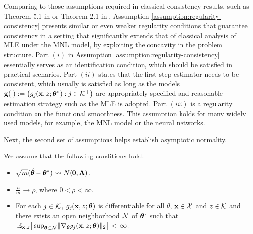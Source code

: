 Comparing to those assumptions required in classical consistency results, such as Theorem 5.1 in \cite{van2000asymptotic} or Theorem 2.1 in \cite{newey1994large}, Assumption \ref{assumption:regularity-consistency} presents similar or even weaker regularity conditions that guarantee consistency in a setting that significantly extends that of classical analysis of MLE under the MNL model, by exploiting the concavity in the problem structure. Part $(i)$ in Assumption \ref{assumption:regularity-consistency} essentially serves as an identification condition, which should be satisfied in practical scenarios. Part $(ii)$ states that the first-step estimator needs to be consistent, which usually is satisfied as long as the models $\mathbf{g}(\cdot) := \big(g_j(\mathbf{x}, z; \bm{\theta}^*):j\in \mathcal{K}^+\big)$ are appropriately specified and reasonable estimation strategy such as the MLE is adopted. Part $(iii)$ is a regularity condition on the functional smoothness. This assumption holds for many widely used models, for example, the MNL model or the neural networks.

Next, the second set of assumptions helps establish asymptotic normality. 

\begin{assm} 
\label{assumption:regularity-normality}
We assume that the following conditions hold. 
\begin{itemize}
\setlength\itemsep{-0.3em}
    \item [$(i)$] $\sqrt{m}(\hat{\bm{\theta}} - \bm{\theta}^*)\rightsquigarrow N(\bm{0}, \bm{\Lambda})$.
    \item [$(ii)$] $\frac{n}{m}\rightarrow \rho$, where $0 < \rho < \infty$. 
    \item [$(iii)$] For each $j\in \mathcal{K}$, $g_j(\mathbf{x}, z; \bm{\theta})$ is differentiable for all $\theta$, $\mathbf{x} \in \mathcal{X}$ and $z\in \mathcal{K}$ and there exists an open neighborhood $\mathcal{N}$ of $\bm{\theta}^*$ such that $\,\mathbb{E}_{\mathbf{x},z}\big[\sup_{\bm{\theta} \subset \mathcal{N}}\lVert \nabla_{\bm{\theta}} g_j(\mathbf{x}, z; \bm{\theta}) \rVert_2\big] \,<\, \infty$.  
\end{itemize}    
\end{assm}

